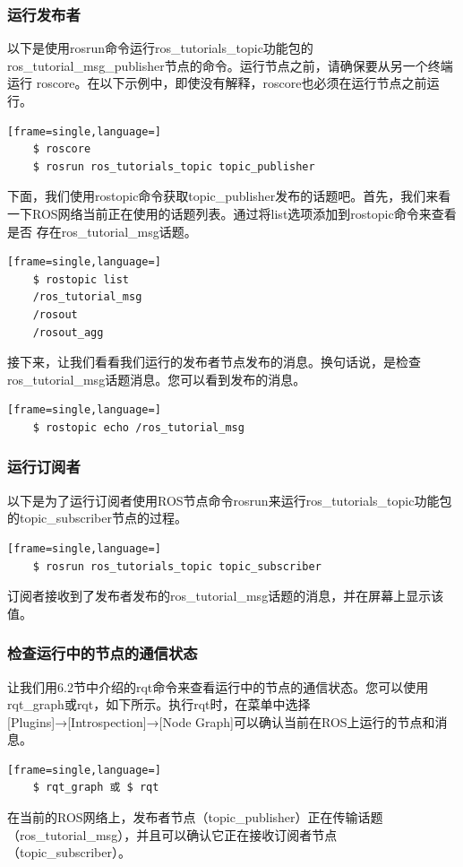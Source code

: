 \documentclass[geye,green,kindle,cn]{elegantnote}
\begin{document}
\subsubsection{运行发布者}
以下是使用rosrun命令运行ros\_tutorials\_topic功能包的ros\_tutorial\_msg\_publisher节点的命令。运行节点之前，请确保要从另一个终端运行 roscore。在以下示例中，即使没有解释，roscore也必须在运行节点之前运行。
\begin{lstlisting}[frame=single,language=]
    $ roscore 
    $ rosrun ros_tutorials_topic topic_publisher
\end{lstlisting}

下面，我们使用rostopic命令获取topic\_publisher发布的话题吧。首先，我们来看 一下ROS网络当前正在使用的话题列表。通过将list选项添加到rostopic命令来查看是否 存在ros\_tutorial\_msg话题。
\begin{lstlisting}[frame=single,language=]
    $ rostopic list 
    /ros_tutorial_msg 
    /rosout 
    /rosout_agg 
\end{lstlisting}

接下来，让我们看看我们运行的发布者节点发布的消息。换句话说，是检查ros\_tutorial\_msg话题消息。您可以看到发布的消息。 
\begin{lstlisting}[frame=single,language=]
    $ rostopic echo /ros_tutorial_msg
\end{lstlisting}
\subsubsection{运行订阅者}
以下是为了运行订阅者使用ROS节点命令rosrun来运行ros\_tutorials\_topic功能包的topic\_subscriber节点的过程。 
\begin{lstlisting}[frame=single,language=]
    $ rosrun ros_tutorials_topic topic_subscriber
\end{lstlisting}

订阅者接收到了发布者发布的ros\_tutorial\_msg话题的消息，并在屏幕上显示该值。
\subsubsection{检查运行中的节点的通信状态}
让我们用6.2节中介绍的rqt命令来查看运行中的节点的通信状态。您可以使用rqt\_graph或rqt，如下所示。执行rqt时，在菜单中选择[Plugins]→[Introspection]→[Node Graph]可以确认当前在ROS上运行的节点和消息。
\begin{lstlisting}[frame=single,language=]
    $ rqt_graph 或 $ rqt 
\end{lstlisting}

在当前的ROS网络上，发布者节点（topic\_publisher）正在传输话题（ros\_tutorial\_msg），并且可以确认它正在接收订阅者节点（topic\_subscriber）。
\end{document}
